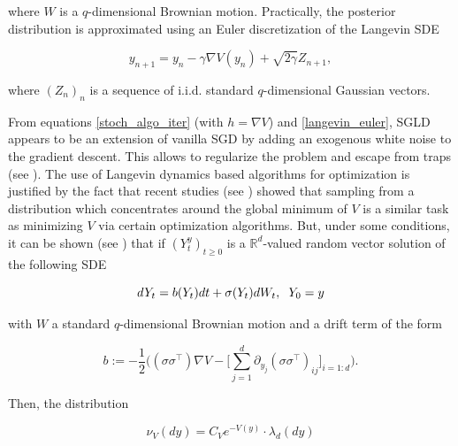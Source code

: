 \documentclass{article}
\numberwithin{equation}{section}
\begin{document}
\noindent
where $W$ is a $q$-dimensional Brownian motion. Practically, the posterior distribution is approximated using an Euler discretization of the Langevin SDE

\begin{equation}
\label{langevin_euler}
y_{n+1} = y_n - \gamma \nabla V(y_n)  + \sqrt{2\gamma}Z_{n+1},
\end{equation}

\noindent
where $(Z_{n})_n$ is a sequence of i.i.d. standard $q$-dimensional Gaussian vectors.

From equations \eqref{stoch_algo_iter} (with $h = \nabla V$) and \eqref{langevin_euler}, SGLD appears to be an extension of vanilla SGD by adding an exogenous white noise to the gradient descent. This allows to regularize the problem and escape from traps (see \cite{addgaussnoise}). The use of Langevin dynamics based algorithms for optimization is justified by the fact that recent studies (see \cite{Dalalyan2014TheoreticalGF,Dalalyan2017FurtherAS}) showed that sampling from a distribution which concentrates around the global minimum of $V$ is a similar task as minimizing $V$ via certain optimization algorithms. But, under some conditions, it can be shown (see \cite{Pags2020UnadjustedLA}) that if $(Y_t^y)_{t \ge 0}$ is a $\mathbb{R}^d$-valued random vector solution of the following SDE

\begin{equation}
\label{sde_gen}
dY_t = b(Y_t)dt + \sigma(Y_t) dW_t, \hspace{0.2cm} Y_0 = y
\end{equation}

\noindent
with $W$ a standard $q$-dimensional Brownian motion and a drift term of the form

\begin{equation}
b := -\frac{1}{2} \Big((\sigma \sigma^\top) \nabla V - \Big[\sum_{j = 1}^{d} \partial_{y_j} (\sigma \sigma^\top)_{ij} \Big]_{i =1:d} \Big).
\end{equation}

\noindent
Then, the distribution

\begin{equation}
\nu_V (dy) = C_V e^{-V(y)} \cdot \lambda_d(dy)
\end{equation}
\end{document}
